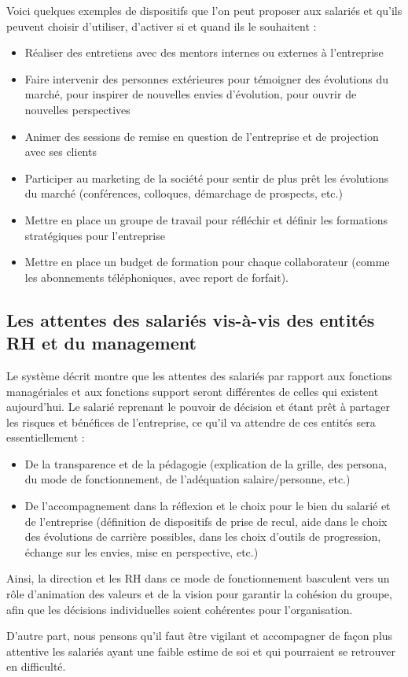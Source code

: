 \documentclass[12pt]{article}
\begin{document}
 Voici quelques exemples de dispositifs que l’on peut proposer aux salariés et qu’ils peuvent choisir d’utiliser, d’activer si et quand ils le souhaitent :
 \begin{itemize}
   \item Réaliser des entretiens avec des mentors internes ou externes à l’entreprise
   \item Faire intervenir des personnes extérieures pour témoigner des évolutions du marché, pour inspirer de nouvelles envies d’évolution, pour ouvrir de nouvelles perspectives
   \item Animer des sessions de remise en question de l’entreprise et de projection avec ses clients
   \item Participer au marketing de la société pour sentir de plus prêt les évolutions du marché (conférences, colloques, démarchage de prospects, etc.)
   \item Mettre en place un groupe de travail pour réfléchir et définir les formations stratégiques pour l’entreprise
   \item Mettre en place un budget de formation pour chaque collaborateur (comme les abonnements téléphoniques, avec report de forfait).
 \end{itemize}

\subsection{Les attentes des salariés vis-à-vis des entités RH et du management }

 Le système décrit montre que les attentes des salariés par rapport aux fonctions managériales et aux fonctions support seront différentes de celles qui existent aujourd’hui. Le salarié reprenant le pouvoir de décision et étant prêt à partager les risques et bénéfices de l’entreprise, ce qu’il va attendre de ces entités sera essentiellement : 
  \begin{itemize}
    \item De la transparence et de la pédagogie (explication de la grille, des persona, du mode de fonctionnement, de l’adéquation salaire/personne, etc.)
    \item De l’accompagnement dans la réflexion et le choix pour le bien du salarié et de l’entreprise (définition de dispositifs de prise de recul, aide dans le choix des évolutions de carrière possibles, dans les choix d’outils de progression, échange sur les envies, mise en perspective, etc.)
  \end{itemize}

 Ainsi, la direction et les RH dans ce mode de fonctionnement basculent vers un rôle d’animation des valeurs et de la vision pour garantir la cohésion du groupe, afin que les décisions individuelles soient cohérentes pour l’organisation. 

 D’autre part, nous pensons qu’il faut être vigilant et accompagner de façon plus attentive les salariés ayant une faible estime de soi et qui pourraient se retrouver en difficulté.

\nocite{*}
\printbibliography
\end{document}
